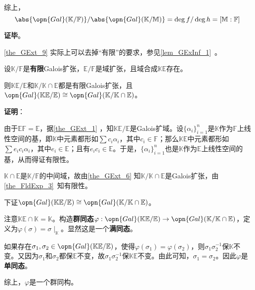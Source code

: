 综上，
\begin{equation}
\abs{\opn{Gal}(\mathbb{K}/\mathbb{F})}/\abs{\opn{Gal}(\mathbb{K}/\mathbb{M})}=\deg f/\deg h=[\mathbb{M}:\mathbb{F}]~
\end{equation}

\textbf{证毕}。


\autoref{the_GExt_9} 实际上可以去掉“有限”的要求，参见\autoref{lem_GExInf_1}~。






\begin{theorem}{}\label{the_GExt_7}
设$\mathbb{K}/\mathbb{F}$是\textbf{有限}Galois扩张，$\mathbb{E}/\mathbb{F}$是域扩张，且域合成$\mathbb{KE}$存在。

则$\mathbb{KE}/\mathbb{E}$和$\mathbb{K}/\mathbb{K}\cap\mathbb{E}$都是有限Galois扩张，且$\opn{Gal}(\mathbb{KE}/\mathbb{E})\cong\opn{Gal}(\mathbb{K}/\mathbb{K}\cap\mathbb{E})$。
\end{theorem}

\textbf{证明}：

由于$\mathbb{E}\mathbb{F}=\mathbb{E}$，据\autoref{the_GExt_1} ，知$\mathbb{KE}/\mathbb{E}$是Galois扩域。设$\{\alpha_i\}_{i=1}^n$是$\mathbb{K}$作为$\mathbb{F}$上线性空间的基，即$\mathbb{K}$中元素都形如$\sum c_i\alpha_i$，其中$c_i\in\mathbb{F}$；那么$\mathbb{KE}$中元素都形如$\sum e_ic_i\alpha_i$，其中$e_i\in\mathbb{E}$；且有$e_ic_i\in\mathbb{E}$。于是，$\{\alpha_i\}_{i=1}^n$也是$\mathbb{K}$作为$\mathbb{E}$上线性空间的基，从而得证有限性。

$\mathbb{K}\cap\mathbb{E}$是$\mathbb{K}/\mathbb{F}$的中间域，故由\autoref{the_GExt_6} 知$\mathbb{K}/\mathbb{K}\cap\mathbb{E}$是Galois扩张，由\autoref{the_FldExp_3}~知有限性。

下证$\opn{Gal}(\mathbb{KE}/\mathbb{E})\cong\opn{Gal}(\mathbb{K}/\mathbb{K}\cap\mathbb{E})$。

注意$\mathbb{KE}\cap \mathbb{K}=\mathbb{K}$。构造\textbf{群同态}$\varphi:\opn{Gal}(\mathbb{KE}/\mathbb{E})\to\opn{Gal}(\mathbb{K}/\mathbb{K}\cap\mathbb{E})$，定义为$\varphi (\sigma) = \sigma\mid_{\mathbb{K}}$。显然这是一个\textbf{满同态}。

如果存在$\sigma_1, \sigma_2\in\opn{Gal}(\mathbb{KE}/\mathbb{E})$，使得$\varphi(\sigma_1)=\varphi(\sigma_2)$，则$\sigma_1\sigma_2^{-1}$保$\mathbb{K}$不变。又因为$\sigma_1$和$\sigma_2$都保$\mathbb{E}$不变，故$\sigma_1\sigma_2^{-1}$保$\mathbb{KE}$不变。由此可知，$\sigma_1=\sigma_2$。因此$\varphi$是\textbf{单同态}。

综上，$\varphi$是一个群同构。

